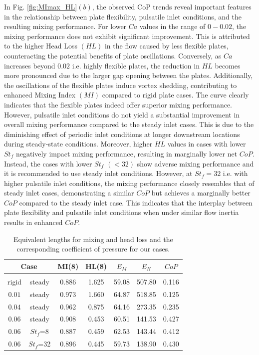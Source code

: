 \documentclass[%
aip,
amsmath,amssymb,
reprint,
]{revtex4-1}
\begin{document}
			In Fig. \ref{fig:MImax_HL}$(b)$, the observed CoP trends reveal important features in the relationship between plate flexibility, pulsatile inlet conditions, and the resulting mixing performance. For lower $Ca$ values in the range of $0-0.02$, the mixing performance does not exhibit significant improvement. This is attributed to the higher Head Loss $(HL)$ in the flow caused by less flexible plates, counteracting the potential benefits of plate oscillations. Conversely, as $Ca$ increases beyond $0.02$ i.e. highly flexible plates, the reduction in $HL$ becomes more pronounced due to the larger gap opening between the plates. Additionally, the oscillations of the flexible plates induce vortex shedding, contributing to enhanced Mixing Index $(MI)$ compared to rigid plate cases. The curve clearly indicates that the flexible plates indeed offer superior mixing performance. However, pulsatile inlet conditions do not yield a substantial improvement in overall mixing performance compared to the steady inlet cases. This is due to the diminishing effect of periodic inlet conditions at longer downstream locations during steady-state conditions. Moreover, higher $HL$ values in cases with lower $St_f$ negatively impact mixing performance, resulting in marginally lower net $CoP$. Instead, the cases with lower $St_f$ $(<32)$ show adverse mixing performance and it is recommended to use steady inlet conditions. However, at $St_f = 32$  i.e. with higher pulsatile inlet conditions, the mixing performance closely resembles that of steady inlet cases, demonstrating a similar $CoP$ but achieves a marginally better $CoP$ compared to the steady inlet case. This indicates that the interplay between plate flexibility and pulsatile inlet conditions when under similar flow inertia results in enhanced $CoP$.
			
			\begin{table}
				\caption{\label{tab:table1}Equivalent lengths for mixing and head loss and the corresponding coefficient of pressure for our cases.}
				\begin{ruledtabular}
					\begin{tabular}{ccccccc}
						\multicolumn{2}{c}{Case} & MI(8) & HL(8) & $E_M$ & $E_H$ & $CoP$\\
						\hline \\
						rigid & steady& 0.886 &1.625 &59.08 &507.80 & 0.116\\
						$0.01$ & steady&  0.973& 1.660 &64.87 &518.85 &  0.125\\
						$0.04$ & steady&  0.962& 0.875 &64.16 &273.35 & 0.235\\
						$0.06$ & steady&  0.908& 0.453 &60.51 &141.53 & 0.427\\
						$0.06$ & $St_f$=8& 0.887& 0.459 &62.53 &143.44 & 0.412\\
						$0.06$ & $St_f$=32&0.896 &0.445 &59.73 &138.90 & 0.430\\
					\end{tabular}
				\end{ruledtabular}
			\end{table}
			
\end{document}
